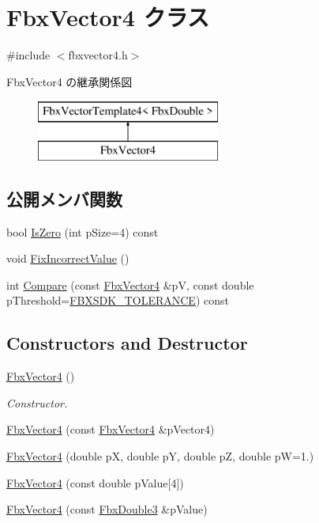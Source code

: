 \hypertarget{class_fbx_vector4}{}\section{Fbx\+Vector4 クラス}
\label{class_fbx_vector4}


{\ttfamily \#include $<$fbxvector4.\+h$>$}

Fbx\+Vector4 の継承関係図\begin{figure}[H]
\begin{center}
\leavevmode
\includegraphics[height=2.000000cm]{class_fbx_vector4}
\end{center}
\end{figure}
\subsection*{公開メンバ関数}
\begin{DoxyCompactItemize}
\item 
bool \hyperlink{class_fbx_vector4_ad64896518153da4f6c72b8d75082c8f3}{Is\+Zero} (int p\+Size=4) const
\item 
void \hyperlink{class_fbx_vector4_adb1810b99d85ab324cfe837fb286dcd2}{Fix\+Incorrect\+Value} ()
\item 
int \hyperlink{class_fbx_vector4_a018a38c6e19a1709ddab74e78f5c2a0b}{Compare} (const \hyperlink{class_fbx_vector4}{Fbx\+Vector4} \&pV, const double p\+Threshold=\hyperlink{fbxtypes_8h_acf3cd6f208edb42ad9c9abbc1f7feea0}{F\+B\+X\+S\+D\+K\+\_\+\+T\+O\+L\+E\+R\+A\+N\+CE}) const
\end{DoxyCompactItemize}
\subsection*{Constructors and Destructor}
\begin{DoxyCompactItemize}
\item 
\hyperlink{class_fbx_vector4_af346570e3050b36bf11a1cf3d162ed4e}{Fbx\+Vector4} ()
\begin{DoxyCompactList}\small\item\em Constructor. \end{DoxyCompactList}\item 
\hyperlink{class_fbx_vector4_a87adf6b4cc9e6aa4b81e5067dd3d6102}{Fbx\+Vector4} (const \hyperlink{class_fbx_vector4}{Fbx\+Vector4} \&p\+Vector4)
\item 
\hyperlink{class_fbx_vector4_a123ea824d4d86519a5f047fa58adca1f}{Fbx\+Vector4} (double pX, double pY, double pZ, double pW=1.)
\item 
\hyperlink{class_fbx_vector4_aaf9d72c9d8930c93bec84e5272088aad}{Fbx\+Vector4} (const double p\+Value\mbox{[}4\mbox{]})
\item 
\hyperlink{class_fbx_vector4_a6f216a9046faeb73c5f54343d8be3374}{Fbx\+Vector4} (const \hyperlink{fbxtypes_8h_ae0a96f14cde566774c7553aa7523b7a7}{Fbx\+Double3} \&p\+Value)
\end{DoxyCompactItemize}
